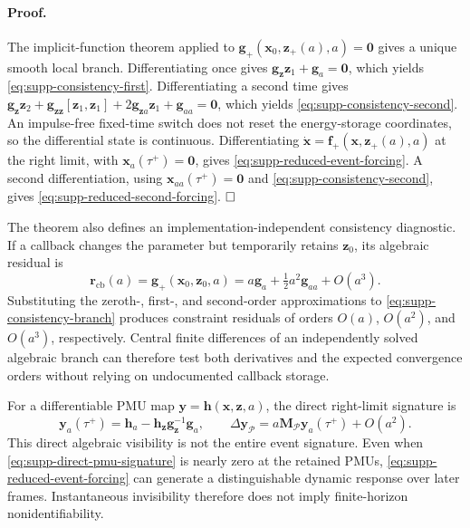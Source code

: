 \paragraph{Proof.}
The implicit-function theorem applied to
$\bm g_+(\bm x_0,\bm z_+(a),a)=\bm0$ gives a unique smooth local branch.
Differentiating once gives
$\bm g_{\bm z}\bm z_1+\bm g_a=\bm0$, which yields
\eqref{eq:supp-consistency-first}. Differentiating a second time gives
$\bm g_{\bm z}\bm z_2+\bm g_{\bm z\bm z}[\bm z_1,\bm z_1]
+2\bm g_{\bm z a}\bm z_1+\bm g_{aa}=\bm0$, which yields
\eqref{eq:supp-consistency-second}. An impulse-free fixed-time switch does not
reset the energy-storage coordinates, so the differential state is continuous.
Differentiating $\dot{\bm x}=\bm f_+(\bm x,\bm z_+(a),a)$ at the right limit,
with $\bm x_a(\tau^+)=\bm0$, gives
\eqref{eq:supp-reduced-event-forcing}. A second differentiation, using
$\bm x_{aa}(\tau^+)=\bm0$ and \eqref{eq:supp-consistency-second}, gives
\eqref{eq:supp-reduced-second-forcing}. $\hfill\square$

The theorem also defines an implementation-independent consistency diagnostic. If
a callback changes the parameter but temporarily retains $\bm z_0$, its algebraic
residual is
\begin{equation}
 \bm r_{\mathrm{cb}}(a)
 =\bm g_+(\bm x_0,\bm z_0,a)
 =a\bm g_a+\tfrac12a^2\bm g_{aa}+O(a^3).
 \label{eq:supp-callback-residual}
\end{equation}
Substituting the zeroth-, first-, and second-order approximations to
\eqref{eq:supp-consistency-branch} produces constraint residuals of orders
$O(a)$, $O(a^2)$, and $O(a^3)$, respectively. Central finite differences of an
independently solved algebraic branch can therefore test both derivatives and the
expected convergence orders without relying on undocumented callback storage.

For a differentiable PMU map $\bm y=\bm h(\bm x,\bm z,a)$, the direct
right-limit signature is
\begin{equation}
 \bm y_a(\tau^+)
 =\bm h_a-\bm h_{\bm z}\bm g_{\bm z}^{-1}\bm g_a,
 \qquad
 \Delta\bm y_{\mathcal P}
 =a\bm M_{\mathcal P}\bm y_a(\tau^+)+O(a^2).
 \label{eq:supp-direct-pmu-signature}
\end{equation}
This direct algebraic visibility is not the entire event signature. Even when
\eqref{eq:supp-direct-pmu-signature} is nearly zero at the retained PMUs,
\eqref{eq:supp-reduced-event-forcing} can generate a distinguishable dynamic
response over later frames. Instantaneous invisibility therefore does not imply
finite-horizon nonidentifiability.

